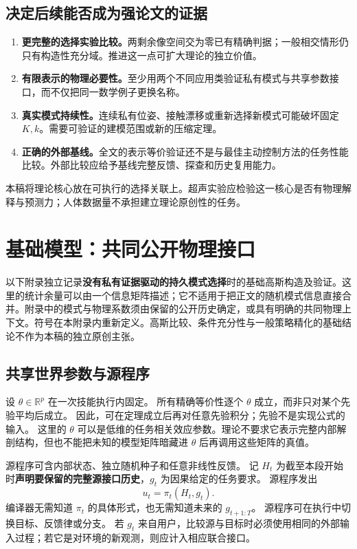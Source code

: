\documentclass[UTF8,fontset=fandol,11pt,a4paper]{ctexart}
\newcommand{\R}{\mathbb R}
\theoremstyle{definition}
\theoremstyle{remark}
\numberwithin{equation}{section}
\begin{document}
\subsection{决定后续能否成为强论文的证据}
\begin{enumerate}
\item \textbf{更完整的选择实验比较。}两剩余像空间交为零已有精确判据；一般相交情形仍只有构造性充分域。推进这一点可扩大理论的独立价值。
\item \textbf{有限表示的物理必要性。}至少用两个不同应用类验证私有模式与共享参数接口，而不仅把同一数学例子更换名称。
\item \textbf{真实模式持续性。}连续私有位姿、接触漂移或重新选择新模式可能破坏固定 $K,k$。需要可验证的建模范围或新的压缩定理。
\item \textbf{正确的外部基线。}全文的表示等价验证还不是与最佳主动控制方法的任务性能比较。外部比较应给予基线完整反馈、探查和历史复用能力。
\end{enumerate}

本稿将理论核心放在可执行的选择关联上。超声实验应检验这一核心是否有物理解释与预测力；人体数据量不承担建立理论原创性的任务。


\clearpage
\appendix
\section{基础模型：共同公开物理接口}
\label{sec:model}

\begin{keybox}
以下附录独立记录\textbf{没有私有证据驱动的持久模式选择}时的基础高斯构造及验证。这里的统计余量可以由一个信息矩阵描述；它不适用于把正文的随机模式信息直接合并。附录中的模式与物理系数须由保留的公开历史确定，或具有明确的共同物理上下文。符号在本附录内重新定义。高斯比较、条件充分性与一般策略精化的基础结论不作为本稿的独立原创主张。
\end{keybox}

\subsection{共享世界参数与源程序}
设 $\theta\in\R^p$ 在一次技能执行内固定。
所有精确等价性逐个 $\theta$ 成立，而非只对某个先验平均后成立。
因此，可在定理成立后再对任意先验积分；先验不是实现公式的输入。
这里的 $\theta$ 可以是低维的任务相关效应参数。理论不要求它表示完整内部解剖结构，但也不能把未知的模型矩阵暗藏进 $\theta$ 后再调用这些矩阵的真值。

源程序可含内部状态、独立随机种子和任意非线性反馈。
记 $H_t$ 为截至本段开始时\textbf{声明要保留的完整源接口历史}，$g_t$ 为因果给定的任务要求。
源程序发出
\begin{equation}
 u_t=\pi_t(H_t,g_t).
\end{equation}
编译器无需知道 $\pi_t$ 的具体形式，也无需知道未来的 $g_{t+1:T}$。
源程序可在执行中切换目标、反馈律或分支。
若 $g_t$ 来自用户，比较源与目标时必须使用相同的外部输入过程；若它是对环境的新观测，则应计入相应联合接口。
\end{document}
